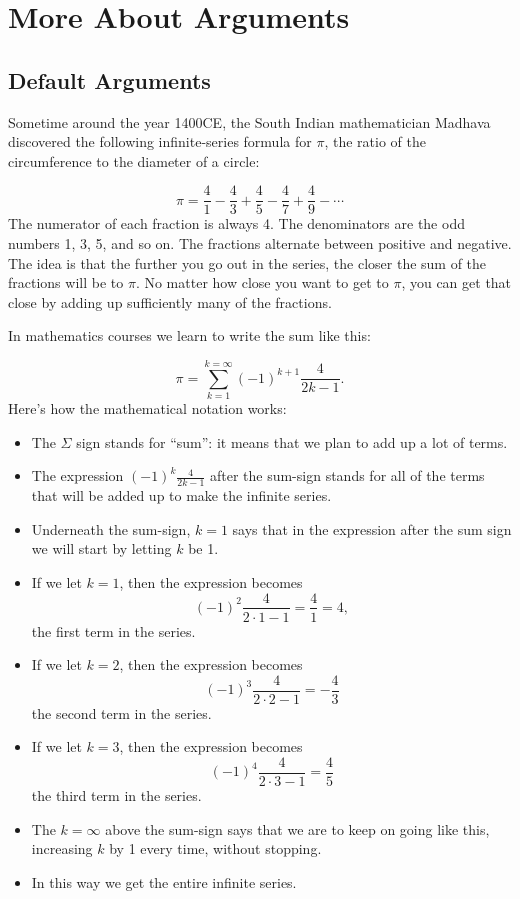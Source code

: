 \documentclass[]{book}
\providecommand{\tightlist}{%
  \setlength{\itemsep}{0pt}\setlength{\parskip}{0pt}}
\theoremstyle{definition}
\theoremstyle{definition}
\theoremstyle{remark}
\begin{document}
{\section{More About Arguments}\label{more-about-arguments}

\subsection{Default Arguments}\label{default-arguments}

Sometime around the year 1400CE, the South Indian mathematician Madhava
discovered the following infinite-series formula for \(\pi\), the ratio
of the circumference to the diameter of a circle:

\[\pi = \frac{4}{1} - \frac{4}{3} + \frac{4}{5} - \frac{4}{7} +\frac{4}{9} - \cdots\]
The numerator of each fraction is always 4. The denominators are the odd
numbers 1, 3, 5, and so on. The fractions alternate between positive and
negative. The idea is that the further you go out in the series, the
closer the sum of the fractions will be to \(\pi\). No matter how close
you want to get to \(\pi\), you can get that close by adding up
sufficiently many of the fractions.

In mathematics courses we learn to write the sum like this:

\[\pi = \sum_{k=1}^{k=\infty} (-1)^{k+1}\frac{4}{2k-1}.\] Here's how the
mathematical notation works:

\begin{itemize}
\tightlist
\item
  The \(\Sigma\) sign stands for ``sum'': it means that we plan to add
  up a lot of terms.
\item
  The expression \((-1)^k\frac{4}{2k-1}\) after the sum-sign stands for
  all of the terms that will be added up to make the infinite series.
\item
  Underneath the sum-sign, \(k=1\) says that in the expression after the
  sum sign we will start by letting \(k\) be 1.
\item
  If we let \(k=1\), then the expression becomes
  \[(-1)^2\frac{4}{2 \cdot 1 -1} = \frac{4}{1} = 4,\] the first term in
  the series.
\item
  If we let \(k=2\), then the expression becomes
  \[(-1)^3\frac{4}{2 \cdot 2 -1} = -\frac{4}{3}\] the second term in the
  series.
\item
  If we let \(k=3\), then the expression becomes
  \[(-1)^4\frac{4}{2 \cdot 3 -1} = \frac{4}{5}\] the third term in the
  series.
\item
  The \(k = \infty\) above the sum-sign says that we are to keep on
  going like this, increasing \(k\) by 1 every time, without stopping.
\item
  In this way we get the entire infinite series.
\end{itemize}

}
\end{document}
